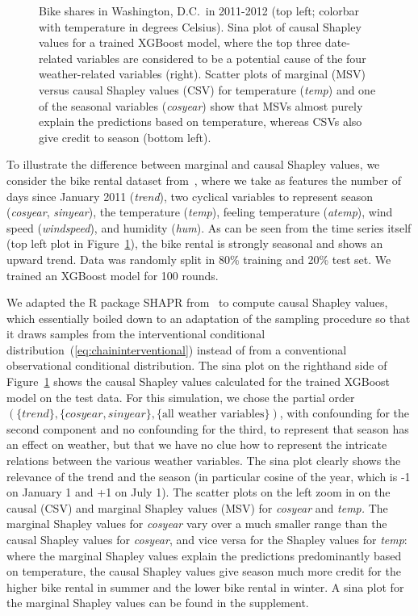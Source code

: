 \documentclass{article}
\begin{document}
\begin{figure}[t]
\begin{minipage}{.5\linewidth}
	\end{minipage}
	\caption{Bike shares in Washington, D.C.\ in 2011-2012 (top left; colorbar with temperature in degrees Celsius). Sina plot of causal Shapley values for a trained XGBoost model, where the top three date-related variables are considered to be a potential cause of the four weather-related variables (right). Scatter plots of marginal (MSV) versus causal Shapley values (CSV) for temperature ({\em temp}) and one of the seasonal variables ({\em cosyear}) show that MSVs almost purely explain the predictions based on temperature, whereas CSVs also give credit to season (bottom left).}
	\label{fig:trendplot}
\end{figure}

To illustrate the difference between marginal and causal Shapley values, we consider the bike rental dataset from~\cite{fanaee2013bikerental}, where we take as features the number of days since January 2011 ({\em trend}), two cyclical variables to represent season ({\em cosyear}, {\em sinyear}), the temperature ({\em temp}), feeling temperature ({\em atemp}), wind speed ({\em windspeed}), and humidity ({\em hum}). As can be seen from the time series itself (top left plot in Figure~\ref{fig:trendplot}), the bike rental is strongly seasonal and shows an upward trend. Data was randomly split in 80\% training and 20\% test set. We trained an XGBoost model for 100 rounds. 

We adapted the R package SHAPR from~\cite{aas2019explaining} to compute causal Shapley values, which essentially boiled down to an adaptation of the sampling procedure so that it draws samples from the interventional conditional distribution~(\ref{eq:chaininterventional}) instead of from a conventional observational conditional distribution. The sina plot on the righthand side of Figure~\ref{fig:trendplot} shows the causal Shapley values calculated for the trained XGBoost model on the test data. For this simulation, we chose the partial order $(\{\textit{trend}\},\{\textit{cosyear},\textit{sinyear}\},\{\textrm{all weather variables}\})$, with confounding for the second component and no confounding for the third, to represent that season has an effect on weather, but that we have no clue how to represent the intricate relations between the various weather variables. The sina plot clearly shows the relevance of the trend and the season (in particular cosine of the year, which is -1 on January 1 and +1 on July 1). The scatter plots on the left zoom in on the causal (CSV) and marginal Shapley values (MSV) for {\em cosyear} and {\em temp.} The marginal Shapley values for {\em cosyear} vary over a much smaller range than the causal Shapley values for {\em cosyear}, and vice versa for the Shapley values for {\em temp}: where the marginal Shapley values explain the predictions predominantly based on temperature, the causal Shapley values give season much more credit for the higher bike rental in summer and the lower bike rental in winter. A sina plot for the marginal Shapley values can be found in the supplement.
\end{document}
